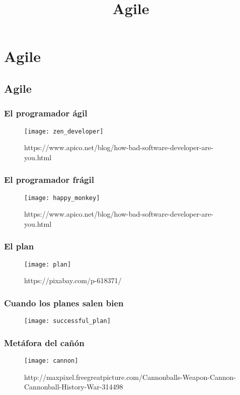 
\title[Agile]{Agile}
\date{}
\author[Pepe Doval]{}
\institute{}

\section{Agile}
\label{sec:Agile}

\usebackgroundtemplate{}
\begin{frame}
  \titlepage
\end{frame}


\subsection{Agile}
\label{subsec:Agile}

\begin{frame}
  \frametitle{El programador ágil}
  \begin{figure}[ht]
    \texttt{[image: zen\_developer]}
    \caption{https://www.apico.net/blog/how-bad-software-developer-are-you.html}
  \end{figure}
\end{frame}

\begin{frame}
  \frametitle{El programador frágil}
  \begin{figure}[ht]
    \texttt{[image: happy\_monkey]}
    \caption{https://www.apico.net/blog/how-bad-software-developer-are-you.html}
  \end{figure}
\end{frame}

\begin{frame}
  \frametitle{El plan}
  \begin{figure}[ht]
    \texttt{[image: plan]}
    \caption{https://pixabay.com/p-618371/}
  \end{figure}
\end{frame}

\begin{frame}
  \frametitle{Cuando los planes salen bien}
  \begin{figure}[ht]
    \texttt{[image: successful\_plan]}
  \end{figure}
\end{frame}

\begin{frame}
  \frametitle{Metáfora del cañón}
  \begin{figure}[ht]
    \texttt{[image: cannon]}
    \caption{http://maxpixel.freegreatpicture.com/Cannonballs-Weapon-Cannon-Cannonball-History-War-314498}
  \end{figure}
\end{frame}

